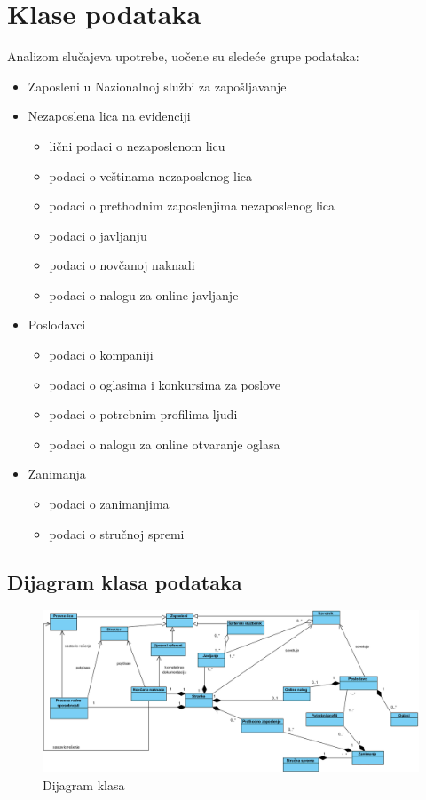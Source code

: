 \section{Klase podataka}

Analizom slu\v cajeva upotrebe, uo\v cene su slede\' ce grupe podataka:

\begin{itemize}
	\item Zaposleni u Nazionalnoj slu\v zbi za zapo\v sljavanje
	\item Nezaposlena lica na evidenciji
		\begin{itemize}
			\item  li\v cni podaci o nezaposlenom licu
			\item podaci o ve\v stinama nezaposlenog lica
			\item podaci o prethodnim zaposlenjima nezaposlenog lica
			\item podaci o javljanju
			\item podaci o nov\v canoj naknadi 
			\item podaci o nalogu za online javljanje
		\end{itemize}
	\item Poslodavci
		\begin{itemize}
			\item podaci o kompaniji
			\item podaci o oglasima i konkursima za poslove
			\item podaci o potrebnim profilima ljudi
			\item podaci o nalogu za online otvaranje oglasa
		\end{itemize}
	\item Zanimanja
		\begin{itemize}
			\item podaci o zanimanjima
			\item podaci o stru\v cnoj spremi
		\end{itemize}
\end{itemize}

\begin{mylandscape}
\subsection{Dijagram klasa podataka}

\begin{figure}[H]
	\centering
	\includegraphics[width=0.85\paperwidth]{dijagrami/dijagrami-klasa/dijagrami-klasa.png}
	\caption{Dijagram klasa}
	\label{dk}
\end{figure}
\end{mylandscape}


